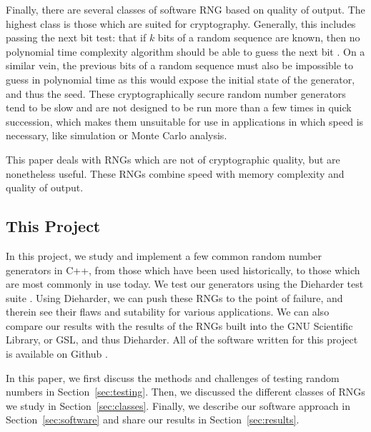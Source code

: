 Finally, there are several classes of software RNG based on quality of output. The highest class is those which are suited for cryptography. Generally, this includes passing the next bit test: that if $k$ bits of a random sequence are known, then no polynomial time complexity algorithm should be able to guess the next bit \cite{Yao_1982}. On a similar vein, the previous bits of a random sequence must also be impossible to guess in polynomial time as this would expose the initial state of the generator, and thus the seed. These cryptographically secure random number generators tend to be slow and are not designed to be run more than a few times in quick succession, which makes them unsuitable for use in applications in which speed is necessary, like simulation or Monte Carlo analysis.

This paper deals with RNGs which are not of cryptographic quality, but are nonetheless useful. These RNGs combine speed with memory complexity and quality of output.

\subsection{This Project}
In this project, we study and implement a few common random number generators in C++, from those which have been used historically, to those which are most commonly in use today. We test our generators using the Dieharder test suite \cite{dieharder_website}. Using Dieharder, we can push these RNGs to the point of failure, and therein see their flaws and sutability for various applications. We can also compare our results with the results of the RNGs built into the GNU Scientific Library, or GSL, and thus Dieharder. All of the software written for this project is available on Github \cite{github_repo}.

In this paper, we first discuss the methods and challenges of testing random numbers in Section~\ref{sec:testing}. Then, we discussed the different classes of RNGs we study in Section~\ref{sec:classes}. Finally, we describe our software approach in Section~\ref{sec:software} and share our results in Section~\ref{sec:results}.

